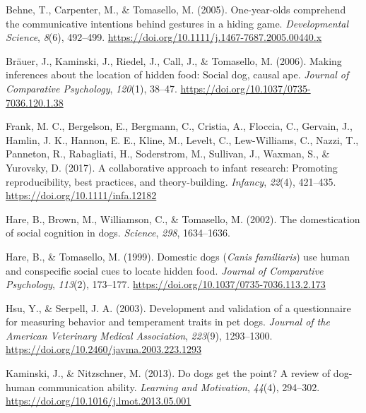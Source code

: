 \documentclass[
  man,floatsintext]{apa6}
\newlength{\cslhangindent}
\newlength{\cslentryspacingunit} %
\newenvironment{CSLReferences}[2] %
 {%
  \setlength{\parindent}{0pt}
  \ifodd #1
  \let\oldpar\par
  \def\par{\hangindent=\cslhangindent\oldpar}
  \fi
  \setlength{\parskip}{#2\cslentryspacingunit}
 }%
 {}
\begin{document}
\hypertarget{refs}{}
\begin{CSLReferences}{1}{0}
\leavevmode{}%
Behne, T., Carpenter, M., \& Tomasello, M. (2005). One-year-olds comprehend the communicative intentions behind gestures in a hiding game. \emph{Developmental Science}, \emph{8}(6), 492--499. \url{https://doi.org/10.1111/j.1467-7687.2005.00440.x}

\leavevmode{}%
Bräuer, J., Kaminski, J., Riedel, J., Call, J., \& Tomasello, M. (2006). Making inferences about the location of hidden food: {Social} dog, causal ape. \emph{Journal of Comparative Psychology}, \emph{120}(1), 38--47. \url{https://doi.org/10.1037/0735-7036.120.1.38}

\leavevmode{}%
Frank, M. C., Bergelson, E., Bergmann, C., Cristia, A., Floccia, C., Gervain, J., Hamlin, J. K., Hannon, E. E., Kline, M., Levelt, C., Lew-Williams, C., Nazzi, T., Panneton, R., Rabagliati, H., Soderstrom, M., Sullivan, J., Waxman, S., \& Yurovsky, D. (2017). A collaborative approach to infant research: Promoting reproducibility, best practices, and theory-building. \emph{Infancy}, \emph{22}(4), 421--435. \url{https://doi.org/10.1111/infa.12182}

\leavevmode{}%
Hare, B., Brown, M., Williamson, C., \& Tomasello, M. (2002). The domestication of social cognition in dogs. \emph{Science}, \emph{298}, 1634--1636.

\leavevmode{}%
Hare, B., \& Tomasello, M. (1999). Domestic dogs (\emph{{Canis} familiaris}) use human and conspecific social cues to locate hidden food. \emph{Journal of Comparative Psychology}, \emph{113}(2), 173--177. \url{https://doi.org/10.1037/0735-7036.113.2.173}

\leavevmode{}%
Hsu, Y., \& Serpell, J. A. (2003). Development and validation of a questionnaire for measuring behavior and temperament traits in pet dogs. \emph{Journal of the American Veterinary Medical Association}, \emph{223}(9), 1293--1300. \url{https://doi.org/10.2460/javma.2003.223.1293}

\leavevmode{}%
Kaminski, J., \& Nitzschner, M. (2013). Do dogs get the point? {A} review of dog-human communication ability. \emph{Learning and Motivation}, \emph{44}(4), 294--302. \url{https://doi.org/10.1016/j.lmot.2013.05.001}


\end{CSLReferences}
\end{document}
